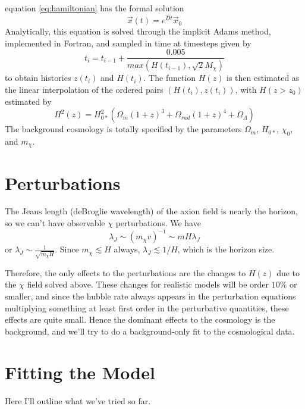 \documentclass{emulateapj}
\begin{document}
equation \ref{eq:hamiltonian} has the formal solution
\begin{equation}
\vec{x}(t) = e^{\hat{D}t}\vec{x}_0
\end{equation}
Analytically, this equation is solved through the implicit Adams method, implemented in Fortran, and sampled in time at timesteps given by 
\begin{equation}
t_i = t_{i-1} + \frac{0.005}{max\left(H(t_{i-1}), \sqrt{2} M_\chi \right)}
\end{equation}
to obtain histories $z(t_i)$ and $H(t_i)$.  The function $H(z)$ is then estimated as the linear interpolation of the ordered pairs $\left(H(t_i), z(t_i)\right)$, with $H(z > z_0)$ estimated by
\begin{equation}
H^2(z) = H^2_{0*} (\Omega_m (1+z)^3 + \Omega_{rad} (1+z)^4 + \Omega_\Lambda)
\end{equation}  
The background cosmology is totally specified by the parameters $\Omega_m$, $H_{0*}$, $\chi_0$, and $m_\chi$.

\section{Perturbations}
The Jeans length (deBroglie wavelength) of the axion field is nearly the horizon, so we can't have observable $\chi$ perturbations. We have
\begin{equation}
\lambda_J \sim (m_\chi v)^{-1} \sim m H \lambda_J 
\end{equation} 
or $\lambda_J \sim \frac{1}{\sqrt{m_\chi H}}$.  Since $m_\chi \lesssim H$ always, $\lambda_J \lesssim 1/H$, which is the horizon size.

Therefore, the only effects to the perturbations are the changes to $H(z)$ due to the $\chi$ field solved above.  These changes for realistic models will be order $10\%$ or smaller, and since the hubble rate always appears in the perturbation equations multiplying something at least first order in the perturbative quantities, these effects are quite small.  Hence the dominant effects to the cosmology is the background, and we'll try to do a background-only fit to the cosmological data.

\section{Fitting the Model}
Here I'll outline what we've tried so far.
\end{document}
